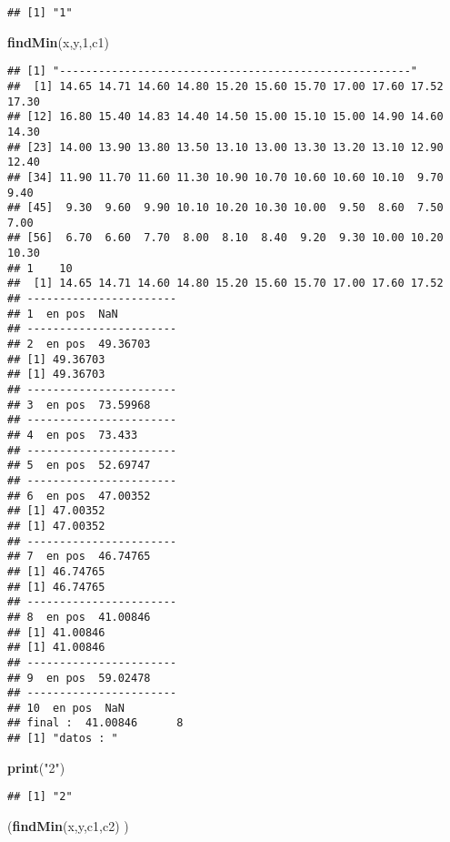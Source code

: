 \documentclass[]{article}
\newenvironment{Shaded}{\begin{snugshade}}{\end{snugshade}}
\newcommand{\KeywordTok}[1]{\textcolor[rgb]{0.13,0.29,0.53}{\textbf{#1}}}
\newcommand{\DecValTok}[1]{\textcolor[rgb]{0.00,0.00,0.81}{#1}}
\newcommand{\StringTok}[1]{\textcolor[rgb]{0.31,0.60,0.02}{#1}}
\newcommand{\NormalTok}[1]{#1}
\begin{document}
\begin{verbatim}
## [1] "1"
\end{verbatim}

\begin{Shaded}
\begin{Highlighting}[]
\KeywordTok{findMin}\NormalTok{(x,y,}\DecValTok{1}\NormalTok{,c1)}
\end{Highlighting}
\end{Shaded}

\begin{verbatim}
## [1] "------------------------------------------------------"
##  [1] 14.65 14.71 14.60 14.80 15.20 15.60 15.70 17.00 17.60 17.52 17.30
## [12] 16.80 15.40 14.83 14.40 14.50 15.00 15.10 15.00 14.90 14.60 14.30
## [23] 14.00 13.90 13.80 13.50 13.10 13.00 13.30 13.20 13.10 12.90 12.40
## [34] 11.90 11.70 11.60 11.30 10.90 10.70 10.60 10.60 10.10  9.70  9.40
## [45]  9.30  9.60  9.90 10.10 10.20 10.30 10.00  9.50  8.60  7.50  7.00
## [56]  6.70  6.60  7.70  8.00  8.10  8.40  9.20  9.30 10.00 10.20 10.30
## 1    10 
##  [1] 14.65 14.71 14.60 14.80 15.20 15.60 15.70 17.00 17.60 17.52
## -----------------------
## 1  en pos  NaN 
## -----------------------
## 2  en pos  49.36703 
## [1] 49.36703
## [1] 49.36703
## -----------------------
## 3  en pos  73.59968 
## -----------------------
## 4  en pos  73.433 
## -----------------------
## 5  en pos  52.69747 
## -----------------------
## 6  en pos  47.00352 
## [1] 47.00352
## [1] 47.00352
## -----------------------
## 7  en pos  46.74765 
## [1] 46.74765
## [1] 46.74765
## -----------------------
## 8  en pos  41.00846 
## [1] 41.00846
## [1] 41.00846
## -----------------------
## 9  en pos  59.02478 
## -----------------------
## 10  en pos  NaN 
## final :  41.00846      8 
## [1] "datos : "
\end{verbatim}

\begin{Shaded}
\begin{Highlighting}[]
\KeywordTok{print}\NormalTok{(}\StringTok{"2"}\NormalTok{)}
\end{Highlighting}
\end{Shaded}

\begin{verbatim}
## [1] "2"
\end{verbatim}

\begin{Shaded}
\begin{Highlighting}[]
\NormalTok{(}\KeywordTok{findMin}\NormalTok{(x,y,c1,c2) )}
\end{Highlighting}
\end{Shaded}
\end{document}
